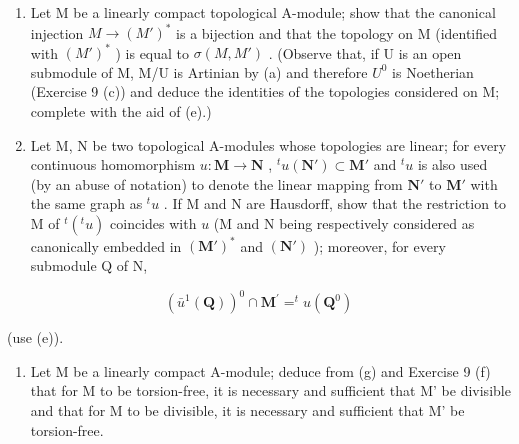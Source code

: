 \begin{enumerate}
\def\labelenumi{(\alph{enumi})}
\setcounter{enumi}{5}
\item
  Let M be a linearly compact topological A-module; show that the canonical injection \(M \rightarrow (M')^{*}\) is a bijection and that the topology on M (identified with \((M')^{*}\) ) is equal to \(\sigma(M, M')\) . (Observe that, if U is an open submodule of M, M/U is Artinian by (a) and therefore \(U^{0}\) is Noetherian (Exercise 9 (c)) and deduce the identities of the topologies considered on M; complete with the aid of (e).)
\item
  Let M, N be two topological A-modules whose topologies are linear; for every continuous homomorphism \(u \colon \mathbf{M} \to \mathbf{N}\) , \(^t u(\mathbf{N}') \subset \mathbf{M}'\) and \(^t u\) is also used (by an abuse of notation) to denote the linear mapping from \(\mathbf{N}'\) to \(\mathbf{M}'\) with the same graph as \(^t u\) . If M and N are Hausdorff, show that the restriction to M of \(^t (^t u)\) coincides with \(u\) (M and N being respectively considered as canonically embedded in \((\mathbf{M}')^*\) and \((\mathbf{N}')\) ); moreover, for every submodule Q of N,
\end{enumerate}

\[
(\bar {u} ^ {1} (\mathbf {Q})) ^ {0} \cap \mathbf {M} ^ {\prime} = ^ {t} u (\mathbf {Q} ^ {0})
\]

(use (e)).

\begin{enumerate}
\def\labelenumi{(\alph{enumi})}
\setcounter{enumi}{7}
\tightlist
\item
  Let M be a linearly compact A-module; deduce from (g) and Exercise 9 (f) that for M to be torsion-free, it is necessary and sufficient that M' be divisible and that for M to be divisible, it is necessary and sufficient that M' be torsion-free.
\end{enumerate}

